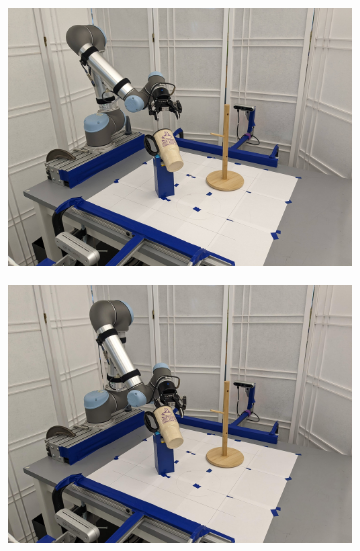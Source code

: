 \documentclass{article}
\begin{document}
\begin{figure}[]
\begin{subfigure}{(\linewidth - 0.05\linewidth)/5}
    \end{subfigure}
    \begin{subfigure}{(\linewidth - 0.05\linewidth)/5}
        \centering
        \includegraphics[width=\linewidth]{figures/episodes/mug_on_tree/3.jpg}
    \end{subfigure}
    \begin{subfigure}{(\linewidth - 0.05\linewidth)/5}
        \centering
        \includegraphics[width=\linewidth]{figures/episodes/mug_on_tree/4.jpg}
    \end{subfigure}
    \begin{subfigure}{(\linewidth - 0.05\linewidth)/5}
        \centering

\end{subfigure}
\end{figure}
\end{document}
